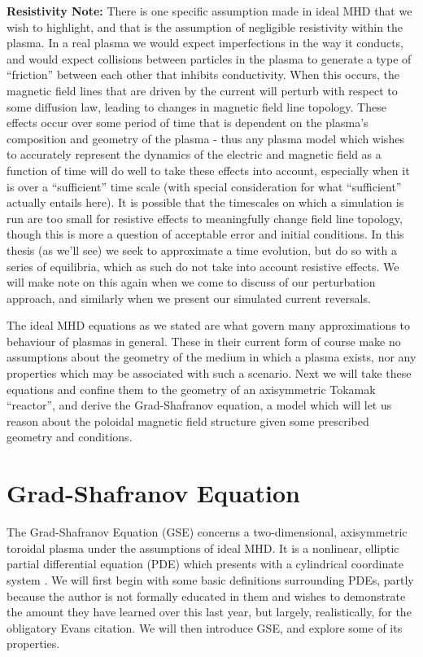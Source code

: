 \textbf{Resistivity Note:}
There is one specific assumption made in ideal MHD that we wish to highlight, and that is the assumption of negligible 
resistivity within the plasma. In a real plasma we would expect imperfections in the way it conducts, and would expect collisions 
between particles in the plasma to generate a type of ``friction'' between each other that inhibits conductivity. 
When this occurs, the magnetic field lines that are driven by the current will perturb with respect to some diffusion law, leading to 
changes in magnetic field line topology. These effects occur over some period of time that is dependent on the plasma's 
composition and geometry of the plasma - thus any plasma model which wishes to accurately represent the dynamics of the electric 
and magnetic field as a function of time will do well to take these effects into account, especially when it is over a ``sufficient'' 
time scale (with special consideration for what ``sufficient'' actually entails here). It is possible that the timescales on which 
a simulation is run are too small for resistive effects to meaningfully change field line topology, though this is more a question of 
acceptable error and initial conditions. In this thesis (as we'll see) we seek to approximate a time evolution, but do so with 
a series of equilibria, which as such do not take into account resistive effects. We will make note on this again when we come to 
discuss of our perturbation approach, and similarly when we present our simulated current reversals.

The ideal MHD equations as we stated are what govern many approximations to behaviour of plasmas in general. These in their current 
form of course make no assumptions about the geometry of the medium in which a plasma exists, nor any properties which 
may be associated with such a scenario. Next we will take these equations and confine them to the geometry of an axisymmetric Tokamak 
``reactor'', and derive the Grad-Shafranov equation, a model which will let us reason about the poloidal magnetic field structure given 
some prescribed geometry and conditions.

\section{Grad-Shafranov Equation}

The Grad-Shafranov Equation (GSE) concerns a two-dimensional, axisymmetric toroidal plasma under the 
assumptions of ideal MHD. It is a nonlinear, elliptic partial differential equation (PDE) which presents 
with a cylindrical coordinate system \cite{shafranov-paper}. We will first begin with some basic definitions surrounding PDEs, partly 
because the author is not formally educated in them and wishes to demonstrate the 
amount they have learned over this last year, but largely, realistically, for the obligatory Evans citation. We 
will then introduce GSE, and explore some of its properties.

